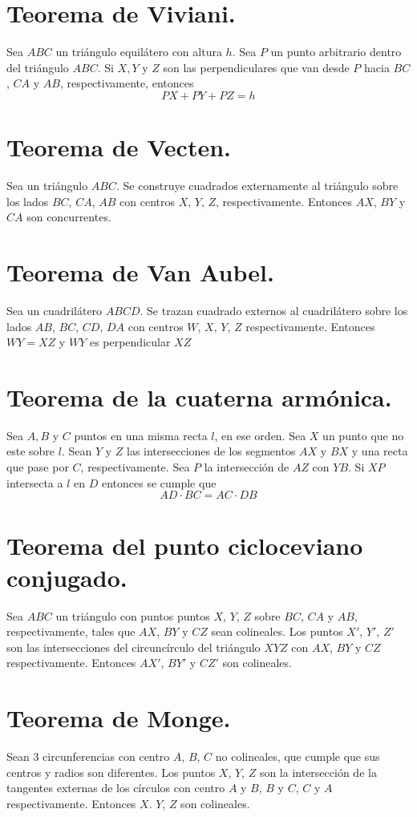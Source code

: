 \documentclass[12pt,a4paper,oneside]{book}
\begin{document}
\section{Teorema de Viviani.}
Sea $ABC$ un triángulo equilátero con altura $h$. Sea $P$ un punto arbitrario dentro del triángulo $ABC$. Si $X, Y$ y $Z$ son las perpendiculares que van desde $P$ hacia $BC$, $CA$ y $AB$, respectivamente, entonces $$PX + PY +PZ = h$$
\section{Teorema de Vecten.}
Sea un triángulo $ABC$. Se construye cuadrados externamente al triángulo sobre los lados $BC$, $CA$, $AB$ con centros $X$, $Y$, $Z$, respectivamente. Entonces $AX$, $BY$ y $CA$ son concurrentes.
\section{Teorema de Van Aubel.}
Sea un cuadrilátero $ABCD$. Se trazan cuadrado externos al cuadrilátero sobre los lados $AB$, $BC$, $CD$, $DA$ con centros $W$, $X$, $Y$, $Z$ respectivamente. Entonces $WY= XZ$ y $WY$ es perpendicular $XZ$
\section{Teorema de la cuaterna armónica.}
Sea $A, B$ y $C$ puntos en una misma recta $l$, en ese orden.  Sea $X$ un punto que no este sobre $l$. Sean $Y$ y $Z$ las intersecciones de los segmentos $AX$ y $BX$ y una recta que pase por $C$, respectivamente. Sea $P$ la intersección de $AZ$ con $YB$. Si $XP$ intersecta a $l$ en $D$ entonces se cumple que $$AD \cdot BC= AC \cdot DB$$
\section{Teorema del punto cicloceviano conjugado.}
Sea $ABC$ un triángulo con puntos puntos $X$, $Y$, $Z$ sobre ${BC}$, ${CA}$ y ${AB}$, respectivamente, tales que $AX$, $BY$ y $CZ$ sean colineales. Los puntos $X'$, $Y'$, $Z'$ son las intersecciones del circuncírculo del triángulo $XYZ$ con $AX$, $BY$ y $CZ$ respectivamente. Entonces $AX'$, $BY'$ y $CZ'$ son colineales.
\section{Teorema de Monge.}
Sean 3 circunferencias con centro $A$, $B$, $C$ no colineales, que cumple que sus centros y radios son diferentes. Los puntos $X$, $Y$, $Z$ son la intersección de la tangentes externas de los círculos con centro $A$ y $B$, $B$ y $C$, $C$ y $A$ respectivamente. Entonces $X$. $Y$, $Z$ son colineales. 
\end{document}
